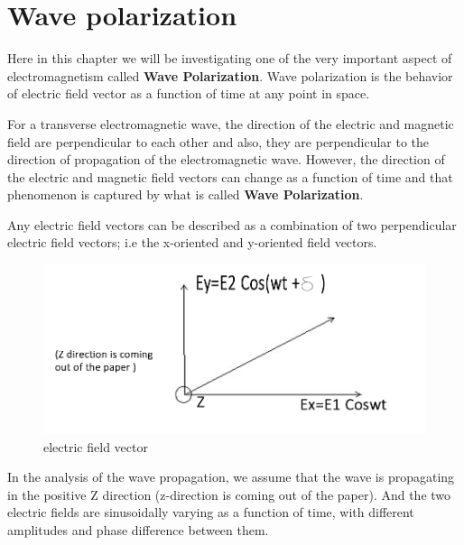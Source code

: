 \chapter{Wave polarization}
Here in this chapter we will be investigating one of the very important aspect of electromagnetism called \textbf{Wave Polarization}. Wave polarization is the behavior of electric field vector as a function of time at any point in space.

For a transverse electromagnetic wave, the direction of the electric and magnetic field are perpendicular to each other and also, they are perpendicular to the direction of propagation of the electromagnetic wave. However, the direction of the electric and magnetic field vectors can change as a function of time and that phenomenon is captured by what is called \textbf{Wave Polarization}.

Any electric field vectors can be described as a combination of two perpendicular electric field vectors; i.e the x-oriented and y-oriented field vectors. 
\begin{figure}[h]
\centering
\includegraphics[width=.8\linewidth]{./graphics/electricfield}
\caption{electric field vector}
\end{figure}

In the analysis of the wave propagation, we assume that the wave is propagating in the positive Z direction (z-direction is coming out of the paper). And the two electric fields are sinusoidally varying as a function of time, with different amplitudes and phase difference between them.	


